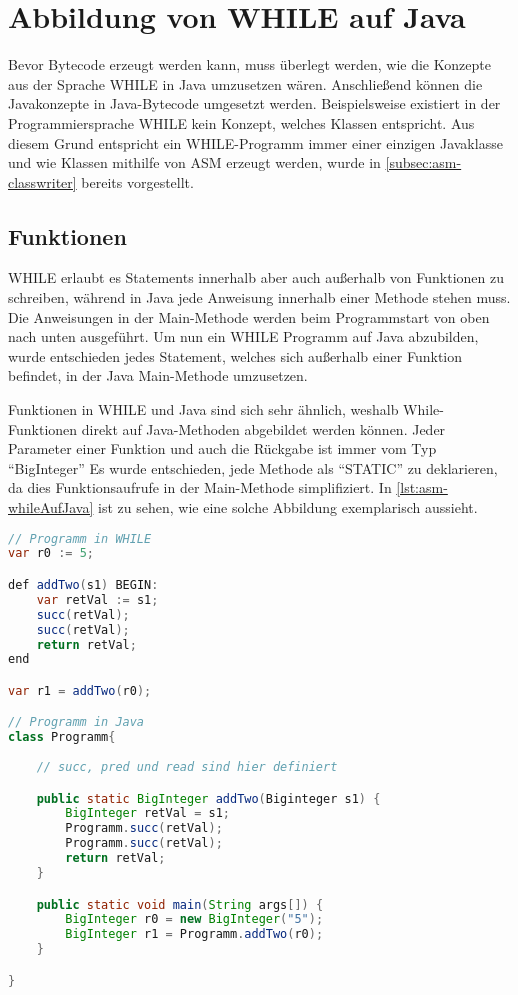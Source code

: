 \section{Abbildung von WHILE auf Java}
Bevor Bytecode erzeugt werden kann, muss überlegt werden, wie die Konzepte aus der Sprache WHILE in Java umzusetzen wären. Anschließend können die Javakonzepte in Java-Bytecode umgesetzt werden. Beispielsweise existiert in der Programmiersprache WHILE kein Konzept, welches Klassen entspricht. Aus diesem Grund entspricht ein WHILE-Programm immer einer einzigen Javaklasse und wie Klassen mithilfe von ASM erzeugt werden, wurde in \cref{subsec:asm-classwriter} bereits vorgestellt.

\subsection{Funktionen}
WHILE erlaubt es Statements innerhalb aber auch außerhalb von Funktionen zu schreiben, während in Java jede Anweisung innerhalb einer Methode stehen muss. Die Anweisungen in der Main-Methode werden beim Programmstart von oben nach unten ausgeführt. Um nun ein WHILE Programm auf Java abzubilden, wurde entschieden jedes Statement, welches sich außerhalb einer Funktion befindet, in der Java Main-Methode umzusetzen. 

Funktionen in WHILE und Java sind sich sehr ähnlich, weshalb While-Funktionen direkt auf Java-Methoden abgebildet werden können. Jeder Parameter einer Funktion und auch die Rückgabe ist immer vom Typ \enquote{BigInteger} Es wurde entschieden, jede Methode als \enquote{STATIC} zu deklarieren, da dies Funktionsaufrufe in der Main-Methode simplifiziert. In \cref{lst:asm-whileAufJava} ist zu sehen, wie eine solche Abbildung exemplarisch aussieht.

\begin{lstlisting}[language=Java, caption=Abbildung von While Funktionen auf Java Funktionen, label={lst:asm-whileAufJava}]
// Programm in WHILE
var r0 := 5;

def addTwo(s1) BEGIN:
	var retVal := s1;
	succ(retVal);
	succ(retVal);
	return retVal;
end

var r1 = addTwo(r0);

// Programm in Java
class Programm{
	
	// succ, pred und read sind hier definiert

	public static BigInteger addTwo(Biginteger s1) {
		BigInteger retVal = s1;
		Programm.succ(retVal);
		Programm.succ(retVal);
		return retVal;
	}

	public static void main(String args[]) {
		BigInteger r0 = new BigInteger("5");
		BigInteger r1 = Programm.addTwo(r0);
	}

}

\end{lstlisting}

